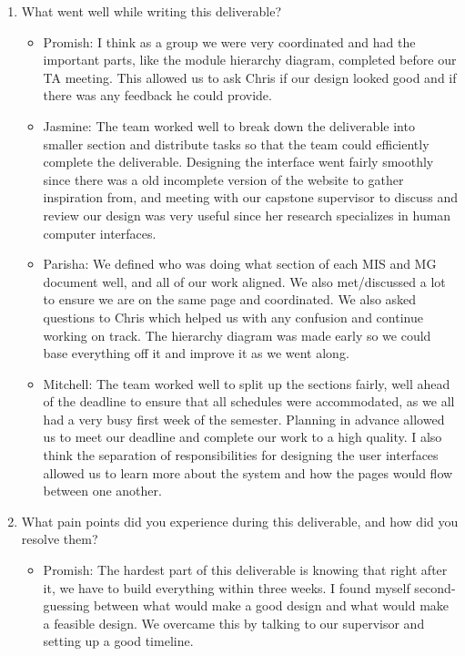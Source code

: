 \documentclass[12pt, titlepage]{article}
\begin{document}
\begin{enumerate}
  \item What went well while writing this deliverable?
  \begin{itemize}
    \item Promish: I think as a group we were very coordinated and had the important parts, like the module
    hierarchy diagram, completed before our TA meeting. This allowed us to ask Chris if our design looked good and if 
    there was any feedback he could provide.
    \item Jasmine: The team worked well to break down the deliverable into smaller section and distribute tasks so that the
    team could efficiently complete the deliverable. Designing the interface went fairly smoothly since there was a
    old incomplete version of the website to gather inspiration from, and meeting with our capstone supervisor to
    discuss and review our design was very useful since her research specializes in human computer interfaces.
    \item Parisha: We defined who was doing what section of each MIS and MG document well, and all of our work aligned.
    We also met/discussed a lot to ensure we are on the same page and coordinated. We also asked questions to Chris
    which helped us with any confusion and continue working on track. The hierarchy diagram was made early so we could base
    everything off it and improve it as we went along.
    \item Mitchell: The team worked well to split up the sections fairly, well ahead of the deadline to ensure that all schedules
    were accommodated, as we all had a very busy first week of the semester. Planning in advance allowed us to meet our deadline and
    complete our work to a high quality. I also think the separation of responsibilities for designing the user interfaces allowed us to
    learn more about the system and how the pages would flow between one another.
  \end{itemize}
  \item What pain points did you experience during this deliverable, and how
    did you resolve them?
    \begin{itemize}
      \item Promish: The hardest part of this deliverable is knowing that right after it, we have to build everything within three weeks.
      I found myself second-guessing between what would make a good design and what would make a feasible design. We overcame
      this by talking to our supervisor and setting up a good timeline.

\end{itemize}
\end{enumerate}
\end{document}
